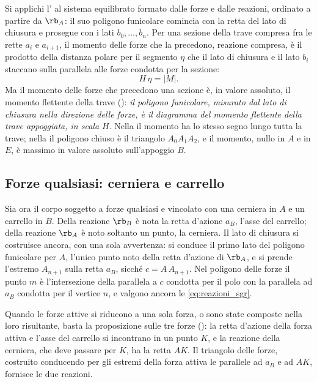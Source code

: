 \begin{oss}
	\label{oss:momento_flettente_sgr}
	Si applichi l' al sistema equilibrato formato dalle forze e
	dalle reazioni, ordinato a partire da $\rb_A$: il suo poligono funicolare comincia con la retta
	del lato di chiusura e prosegue con i lati $b_0, \dots, b_n$. Per una sezione della trave
	compresa fra le rette $a_i$ e $a_{i+1}$, il momento delle forze che la precedono, reazione
	compresa, è il prodotto della distanza polare per il segmento $\eta$ che il lato di chiusura e
	il lato $b_i$ staccano sulla parallela alle forze condotta per la sezione:
	\begin{equation}
		H\,\eta = |M| .
		\label{eq:momento_flettente_sgr}
	\end{equation}
	Ma il momento delle forze che precedono una sezione è, in valore assoluto, il momento flettente
	della trave (): \emph{il poligono funicolare, misurato dal lato di
	chiusura nella direzione delle forze, è il diagramma del momento flettente della trave
	appoggiata, in scala $H$}. Nella  il momento ha lo stesso segno lungo
	tutta la trave; nella  il poligono chiuso è il triangolo $A_0A_1A_2$, e
	il momento, nullo in $A$ e in $E$, è massimo in valore assoluto sull'appoggio $B$.
\end{oss}

\subsection{Forze qualsiasi: cerniera e carrello}
\label{sec:cerniera_carrello_sgr}

Sia ora il corpo soggetto a forze qualsiasi e vincolato con una cerniera in $A$ e un carrello in
$B$. Della reazione $\rb_B$ è nota la retta d'azione $a_B$, l'asse del carrello; della reazione
$\rb_A$ è noto soltanto un punto, la cerniera. Il lato di chiusura si costruisce ancora, con una
sola avvertenza: si conduce il primo lato del poligono funicolare per $A$, l'unico punto noto
della retta d'azione di $\rb_A$, e si prende l'estremo $A_{n+1}$ sulla retta $a_B$, sicché
$c = A\,A_{n+1}$. Nel poligono delle forze il punto $m$ è l'intersezione della parallela a $c$
condotta per il polo con la parallela ad $a_B$ condotta per il vertice $n$, e valgono ancora le
\eqref{eq:reazioni_sgr}.

Quando le forze attive si riducono a una sola forza, o sono state composte nella loro risultante,
basta la proposizione sulle tre forze (): la retta d'azione della
forza attiva e l'asse del carrello si incontrano in un punto $K$, e la reazione della cerniera,
che deve passare per $K$, ha la retta $AK$. Il triangolo delle forze, costruito conducendo per
gli estremi della forza attiva le parallele ad $a_B$ e ad $AK$, fornisce le due reazioni.

